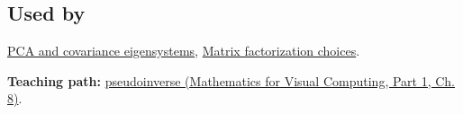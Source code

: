 \subsection{Used by}\label{appendix-541306fdbc1b-used-by}

\hypertarget{appendix-541306fdbc1b-used-by}{}

\hyperref[appendix-ad175ef3c5bf]{PCA and covariance eigensystems}, \hyperref[appendix-221a483bec2d]{Matrix factorization choices}.

\textbf{Teaching path:} \href{../02-Mathematics-for-Visual-Computing-P01/main.pdf\#02-foundations-ii-ch024-pseudoinverse-makes-least-squares-and-minimum-norm-one-operation}{pseudoinverse (Mathematics for Visual Computing, Part 1, Ch. 8)}.
